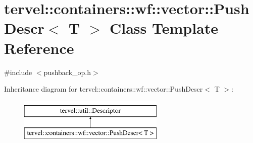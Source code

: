 \hypertarget{classtervel_1_1containers_1_1wf_1_1vector_1_1_push_descr}{}\section{tervel\+:\+:containers\+:\+:wf\+:\+:vector\+:\+:Push\+Descr$<$ T $>$ Class Template Reference}
\label{classtervel_1_1containers_1_1wf_1_1vector_1_1_push_descr}


{\ttfamily \#include $<$pushback\+\_\+op.\+h$>$}

Inheritance diagram for tervel\+:\+:containers\+:\+:wf\+:\+:vector\+:\+:Push\+Descr$<$ T $>$\+:\begin{figure}[H]
\begin{center}
\leavevmode
\includegraphics[height=2.000000cm]{classtervel_1_1containers_1_1wf_1_1vector_1_1_push_descr}
\end{center}
\end{figure}
